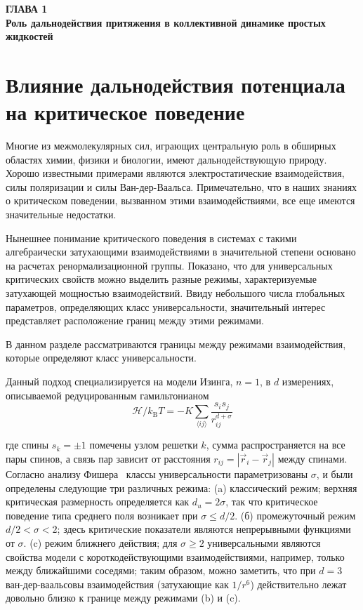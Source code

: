 \newpage
\begin{center}
\textbf{\large ГЛАВА 1 \\ Роль дальнодействия притяжения в коллективной динамике простых жидкостей}
\end{center}



\section{Влияние дальнодействия потенциала на критическое поведение}

Многие из межмолекулярных сил, играющих центральную роль в обширных областях химии, физики и биологии, имеют дальнодействующую природу.
Хорошо известными примерами являются электростатические взаимодействия, силы поляризации и силы Ван-дер-Ваальса.
Примечательно, что в наших знаниях о критическом поведении, вызванном этими взаимодействиями, все еще имеются значительные недостатки.

Нынешнее понимание критического поведения в системах с такими алгебраически затухающими взаимодействиями в значительной степени основано на расчетах ренормализационной группы.
Показано, что для универсальных критических свойств можно выделить разные режимы, характеризуемые затухающей мощностью взаимодействий.
Ввиду небольшого числа глобальных параметров, определяющих класс универсальности, значительный интерес представляет расположение границ между этими режимами.

В данном разделе рассматриваются границы между режимами взаимодействия, которые определяют класс универсальности. 

Данный подход специализируется на модели Изинга, $n = 1$, в $d$ измерениях, описываемой редуцированным гамильтонианом
\begin{equation}
\mathcal{H} / k_{\mathrm{B}} T=-K \sum_{\langle i j\rangle} \frac{s_{i} s_{j}}{r_{i j}^{d+\sigma}}
\label{eq1}
\end{equation}

где спины $s_{k}=\pm 1$ помечены узлом решетки $k$, сумма распространяется на все пары спинов, а связь пар зависит от расстояния $r_{i j}=\left|\vec {r}_{i}-\vec{r}_{j}\right|$ между спинами. Согласно анализу Фишера~\cite{10.1103/PhysRevLett.29.917} классы универсальности параметризованы $\sigma$, и были определены следующие три различных режима: (a) классический режим; верхняя критическая размерность определяется как $d_{u}=2\sigma$, так что критическое поведение типа среднего поля возникает при $\sigma \leq d / 2$. (б) промежуточный режим $d/2<\sigma<2$; здесь критические показатели являются непрерывными функциями от $\sigma$. (c) режим ближнего действия; для $\sigma\geq 2$ универсальными являются свойства модели с короткодействующими взаимодействиями, например, только между ближайшими соседями; таким образом, можно заметить, что при $d=3$ ван-дер-ваальсовы взаимодействия (затухающие как $1/r^{6}$) действительно лежат довольно близко к границе между режимами (b) и (c).

